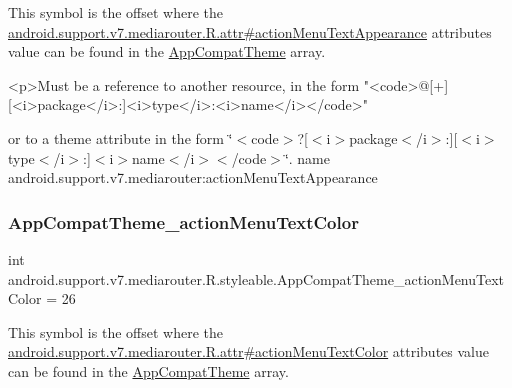 This symbol is the offset where the \hyperlink{classandroid_1_1support_1_1v7_1_1mediarouter_1_1R_1_1attr_aebe88f0c8db6fae20c36c9647a69dd4e}{android.\+support.\+v7.\+mediarouter.\+R.\+attr\#action\+Menu\+Text\+Appearance} attribute\textquotesingle{}s value can be found in the \hyperlink{classandroid_1_1support_1_1v7_1_1mediarouter_1_1R_1_1styleable_a4e3d3900c75d49aeb2f283cac00214d6}{App\+Compat\+Theme} array.

\begin{DoxyVerb}      <p>Must be a reference to another resource, in the form "<code>@[+][<i>package</i>:]<i>type</i>:<i>name</i></code>"
\end{DoxyVerb}
 or to a theme attribute in the form \char`\"{}$<$code$>$?\mbox{[}$<$i$>$package$<$/i$>$\+:\mbox{]}\mbox{[}$<$i$>$type$<$/i$>$\+:\mbox{]}$<$i$>$name$<$/i$>$$<$/code$>$\char`\"{}.  name android.\+support.\+v7.\+mediarouter\+:action\+Menu\+Text\+Appearance \mbox{\label{classandroid_1_1support_1_1v7_1_1mediarouter_1_1R_1_1styleable_aad5d3bda3f4aedec93a8a1407152b908}} 
\subsubsection{\texorpdfstring{App\+Compat\+Theme\+\_\+action\+Menu\+Text\+Color}{AppCompatTheme\_actionMenuTextColor}}
{\footnotesize\ttfamily int android.\+support.\+v7.\+mediarouter.\+R.\+styleable.\+App\+Compat\+Theme\+\_\+action\+Menu\+Text\+Color = 26\hspace{0.3cm}{\ttfamily [static]}}

This symbol is the offset where the \hyperlink{classandroid_1_1support_1_1v7_1_1mediarouter_1_1R_1_1attr_a6625ba27df16c5355edf5c14c613afcb}{android.\+support.\+v7.\+mediarouter.\+R.\+attr\#action\+Menu\+Text\+Color} attribute\textquotesingle{}s value can be found in the \hyperlink{classandroid_1_1support_1_1v7_1_1mediarouter_1_1R_1_1styleable_a4e3d3900c75d49aeb2f283cac00214d6}{App\+Compat\+Theme} array.

